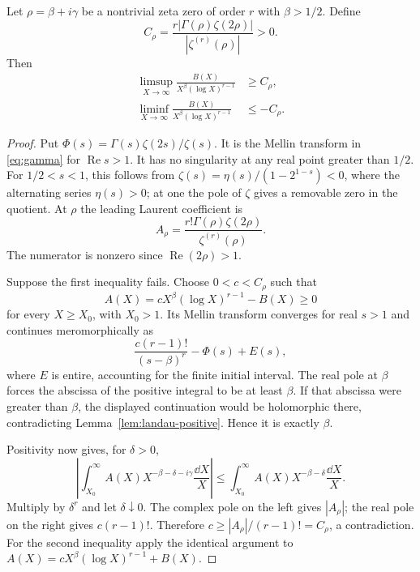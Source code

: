 \begin{theorem}
\label{thm:two-sided-smoothed}
Let \(\rho=\beta+i\gamma\) be a nontrivial zeta zero of order \(r\)
with \(\beta>1/2\). Define
\[
 C_\rho=\frac{r|\Gamma(\rho)\zeta(2\rho)|}
                     {|\zeta^{(r)}(\rho)|}>0.
\]
Then
\begin{align*}
 \limsup_{X\to\infty}
  \frac{B(X)}{X^\beta(\log X)^{r-1}}&\ge C_\rho,\\
 \liminf_{X\to\infty}
  \frac{B(X)}{X^\beta(\log X)^{r-1}}&\le-C_\rho.
\end{align*}
\end{theorem}
\begin{proof}
Put \(\Phi(s)=\Gamma(s)\zeta(2s)/\zeta(s)\).
It is the Mellin transform in \eqref{eq:gamma} for
\(\operatorname{Re}s>1\). It has no singularity at any real
point greater than \(1/2\). For \(1/2<s<1\), this follows from
\(\zeta(s)=\eta(s)/(1-2^{1-s})<0\), where the alternating
series \(\eta(s)>0\); at one the pole of \(\zeta\) gives a
removable zero in the quotient. At \(\rho\) the leading
Laurent coefficient is
\[
 A_\rho=\frac{r!\Gamma(\rho)\zeta(2\rho)}
                     {\zeta^{(r)}(\rho)}.
\]
The numerator is nonzero since \(\operatorname{Re}(2\rho)>1\).

Suppose the first inequality fails. Choose
\(0<c<C_\rho\) such that
\[
 A(X)=cX^\beta(\log X)^{r-1}-B(X)\ge0
\]
for every \(X\ge X_0\), with \(X_0>1\). Its Mellin transform
converges for real \(s>1\) and continues meromorphically as
\[
 \frac{c(r-1)!}{(s-\beta)^r}-\Phi(s)+E(s),
\]
where \(E\) is entire, accounting for the finite initial interval.
The real pole at \(\beta\) forces the abscissa of the positive
integral to be at least \(\beta\). If that abscissa were greater
than \(\beta\), the displayed continuation would be holomorphic
there, contradicting Lemma~\ref{lem:landau-positive}. Hence it
is exactly \(\beta\).

Positivity now gives, for \(\delta>0\),
\[
 \left|\int_{X_0}^\infty A(X)X^{-\beta-\delta-i\gamma}
                       \frac{\dd X}{X}\right|
 \le\int_{X_0}^\infty A(X)X^{-\beta-\delta}
                       \frac{\dd X}{X}.
\]
Multiply by \(\delta^r\) and let \(\delta\downarrow0\).
The complex pole on the left gives \(|A_\rho|\); the real
pole on the right gives \(c(r-1)!\). Therefore
\(c\ge |A_\rho|/(r-1)!=C_\rho\), a contradiction.
For the second inequality apply the identical argument to
\(A(X)=cX^\beta(\log X)^{r-1}+B(X)\).
\end{proof}

